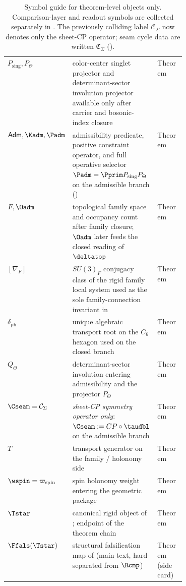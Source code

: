 \begin{table}[p]
\begin{tabularx}{\linewidth}{@{}>{\raggedright\arraybackslash}p{0.23\linewidth}Y>{\raggedright\arraybackslash}p{0.18\linewidth}@{}}
$P_{\mathrm{sing}},P_\Theta$ & color-center singlet projector and determinant-sector involution projector available only after carrier and bosonic-index closure & Theorem \\
$\mathsf{Adm},\Kadm,\Padm$ & admissibility predicate, positive constraint operator, and full operative selector $\Padm=\Pprim P_{\mathrm{sing}}P_\Theta$ on the admissible branch () & Theorem \\
$F,\Oadm$ & topological family space and occupancy count after family closure; $\Oadm$ later feeds the closed reading of $\deltatop$ & Theorem \\
$[\nabla_F]$ & $SU(3)_F$ conjugacy class of the rigid family local system used as the sole family-connection invariant in  & Theorem \\
$\delta_{\mathrm{ph}}$ & unique algebraic transport root on the $C_6$ hexagon used on the closed branch & Theorem \\
$Q_\Theta$ & determinant-sector involution entering admissibility and the projector $P_\Theta$ & Theorem \\
$\Cseam=\mathcal C_\Sigma$ & \emph{sheet-CP symmetry operator only}: $\Cseam:=CP\circ\taudbl$ on the admissible branch & Theorem \\
$T$ & transport generator on the family / holonomy side & Theorem \\
$\wspin=\varpi_{\mathrm{spin}}$ & spin holonomy weight entering the geometric package & Theorem \\
$\Tstar$ & canonical rigid object of ; endpoint of the theorem chain & Theorem \\
$\Ffals(\Tstar)$ & structural falsification map of  (main text, hard-separated from $\Rcmp$) & Theorem (side card) \\
\bottomrule
\end{tabularx}
\caption{Symbol guide for theorem-level objects only. Comparison-layer and readout symbols are
collected separately in . The previously colliding label
$\mathcal C_\Sigma$ now denotes only the sheet-CP operator; seam cycle data are written
$\mathfrak C_\Sigma$ ().}
\label{tab:symbol-guide-theorem}
\label{tab:symbol-guide}
\end{table}

